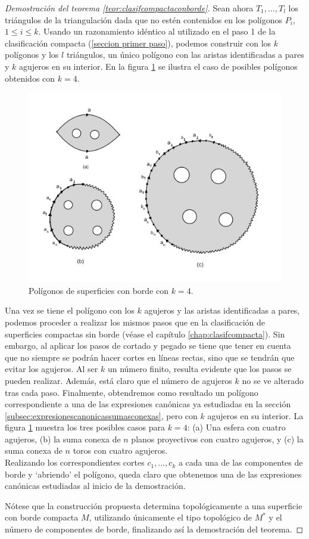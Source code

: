 \documentclass[a4paper,11pt,spanish, twoside, leqno]{tfg-uam}
\theoremstyle{definition}
\begin{document}
\begin{proof}[Demostración del teorema \ref{teor:clasifcompactaconborde}]
Sean ahora $T_1, \ldots, T_l$ los triángulos de la triangulación dada que no estén contenidos en los polígonos $P_i$, $1 \leq i \leq k$. Usando un razonamiento idéntico al utilizado en el paso 1 de la clasificación compacta (\ref{seccion primer paso}), podemos construir con los $k$  polígonos y los $l$ triángulos, un único polígono con las aristas identificadas a pares y $k$ agujeros en su interior. En la figura \ref{imagen ejemplo de poligono con k=4} se ilustra el caso de posibles polígonos obtenidos con $k=4$.

\begin{figure}[h!]
	\centering
	\includegraphics[width=0.5\linewidth]{imagenes/poligonosdesuperficies.png}
	\caption{Polígonos de superficies con borde con $k=4$.}	
    \label{imagen ejemplo de poligono con k=4}
\end{figure}

Una vez se tiene el polígono con los $k$ agujeros y las aristas identificadas a pares, podemos proceder a realizar los mismos pasos que en la clasificación de superficies compactas sin borde (véase el capítulo \ref{chap:clasifcompacta}). Sin embargo, al aplicar los pasos de cortado y pegado se tiene que tener en cuenta que no siempre se podrán hacer cortes en líneas rectas, sino que se tendrán que evitar los agujeros. Al ser $k$ un número finito, resulta evidente que los pasos se pueden realizar. Además, está claro que el número de agujeros $k$ no se ve alterado tras cada paso. Finalmente, obtendremos como resultado un polígono correspondiente a una de las expresiones canónicas ya estudiadas en la sección \ref{subsec:expresionescanonicassumasconexas}, pero con $k$ agujeros en su interior. La figura \ref{imagen ejemplo de poligono con k=4} muestra los tres posibles casos para $k=4$: (a) Una esfera con cuatro agujeros, (b) la suma conexa de $n$ planos proyectivos con cuatro agujeros, y (c) la suma conexa de $n$ toros con cuatro agujeros.\\
Realizando los correspondientes cortes $c_1, \ldots, c_k$ a cada una de las componentes de borde y `abriendo' el polígono, queda claro que obtenemos una de las expresiones canónicas estudiadas al inicio de la demostración. 

Nótese que la construcción propuesta determina topológicamente a una superficie con borde compacta $M$, utilizando únicamente el tipo topológico de $M^*$ y el número de componentes de borde, finalizando así la demostración del teorema.

\end{proof}
\end{document}

